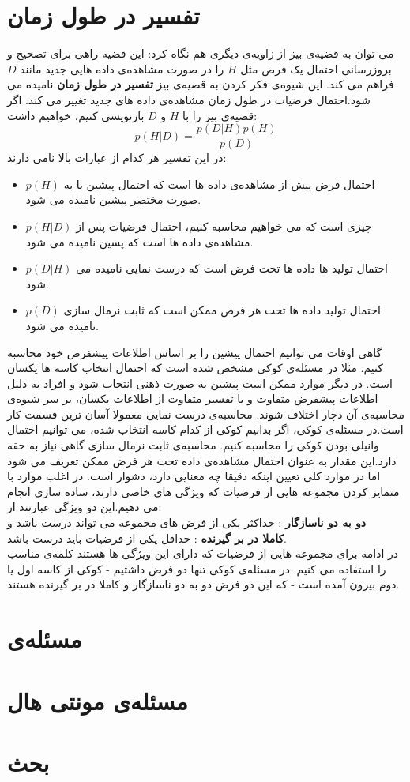 \section{تفسیر در طول زمان}
می توان به قضیه‌ی بیز از زاویه‌ی دیگری هم نگاه کرد: این قضیه راهی برای تصحیح و بروزرسانی احتمال یک فرض مثل $H$ را در صورت مشاهده‌ی داده هایی جدید مانند $D$ فراهم می کند. این شیوه‌ی فکر کردن به قضیه‌ی بیز \textbf{تفسیر در طول زمان} نامیده می شود.احتمال فرضیات در طول زمان مشاهده‌ی داده های جدید تغییر می کند.
اگر قضیه‌ی بیز را با $H$ و $D$ بازنویسی کنیم، خواهیم داشت:
$$ p(H|D) = \frac{p(D|H)p(H)}{p(D)} $$
در این تفسیر هر کدام از عبارات بالا نامی دارند:
\begin{itemize}
\item $p(H)$ احتمال فرض پیش از مشاهده‌ی داده ها است که احتمال پیشین با به صورت مختصر پیشین نامیده می شود.
\item $p(H|D)$ چیزی است که می خواهیم محاسبه کنیم، احتمال فرضیات پس از مشاهده‌ی داده ها است که پسین نامیده می شود.
\item $p(D|H)$ احتمال تولید ها داده ها تحت فرض است که درست نمایی نامیده می شود.
\item $p(D)$ احتمال تولید داده ها تحت هر فرض ممکن است که ثابت نرمال سازی  نامیده می شود.
\end{itemize}
گاهی اوقات می توانیم احتمال پیشین را بر اساس اطلاعات پیشفرض خود محاسبه کنیم. مثلا در مسئله‌ی کوکی مشخص شده است که احتمال انتخاب کاسه ها یکسان است. در دیگر موارد ممکن است پیشین به صورت ذهنی انتخاب شود و افراد به دلیل اطلاعات پیشفرض متفاوت و یا تفسیر متفاوت از اطلاعات یکسان، بر سر شیوه‌ی محاسبه‌ی آن دچار اختلاف شوند.
محاسبه‌ی درست نمایی معمولا آسان ترین قسمت کار است.در مسئله‌ی کوکی، اگر بدانیم کوکی از کدام کاسه انتخاب شده، می توانیم احتمال وانیلی بودن کوکی را محاسبه کنیم.
محاسبه‌ی ثابت نرمال سازی گاهی نیاز به حقه دارد.این مقدار به عنوان احتمال مشاهده‌ی داده تحت هر فرض ممکن تعریف می شود اما در موارد کلی تعیین اینکه دقیقا چه معنایی دارد، دشوار است. در اغلب موارد با متمایز کردن مجموعه هایی از فرضیات که ویژگی های خاصی دارند، ساده سازی انجام می دهیم.این دو ویژگی عبارتند از:\\
\textbf{دو به دو ناسازگار} : حداکثر یکی از فرض های مجموعه می تواند درست باشد و\\
\textbf{کاملا در بر گیرنده} : حداقل یکی از فرضیات باید درست باشد.\\
در ادامه برای مجموعه هایی از فرضیات که دارای این ویژگی ها هستند کلمه‌ی مناسب را استفاده می کنیم. در مسئله‌ی کوکی تنها دو فرض داشتیم - کوکی از کاسه اول یا دوم بیرون آمده است - که این دو فرض دو به دو ناسازگار و کاملا در بر گیرنده هستند.
\section{مسئله‌ی }
\section{مسئله‌ی مونتی هال}
\section{بحث}

